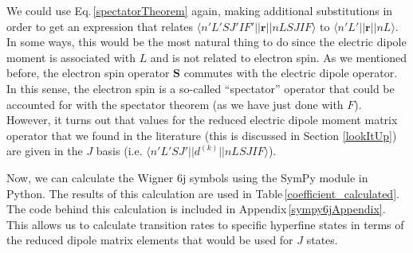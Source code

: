 We could use Eq.\,\ref{spectatorTheorem} again, making additional substitutions in order to get an expression that relates $\langle n' L' S J' I F' ||\mathbf{r}||n L S J I F\rangle$ to $\langle n' L'||\mathbf{r}||n L \rangle$. In some ways, this would be the most natural thing to do since the electric dipole moment is associated with $L$ and is not related to electron spin. As we mentioned before, the electron spin operator $\mathbf{S}$ commutes with the electric dipole operator. In this sense, the electron spin is a so-called ``spectator'' operator that could be accounted for with the spectator theorem (as we have just done with $F$). However, it turns out that values for the reduced electric dipole moment matrix operator that we found in the literature (this is discussed in Section \ref{lookItUp}) are given in the $J$ basis (i.e. $\langle n'L'S J'||d^{(k)}||n L S J I F\rangle$).

%
%
%

Now, we can calculate the Wigner 6j symbols using the SymPy module in Python\cite{sympy,rasch6j}.
The results of this calculation are used in Table\,\ref{coefficient_calculated}. %
The code behind this calculation is included in Appendix\,\ref{sympy6jAppendix}.
This allows us to calculate transition rates to specific hyperfine states in terms of the reduced dipole matrix elements that would be used for $J$ states.

